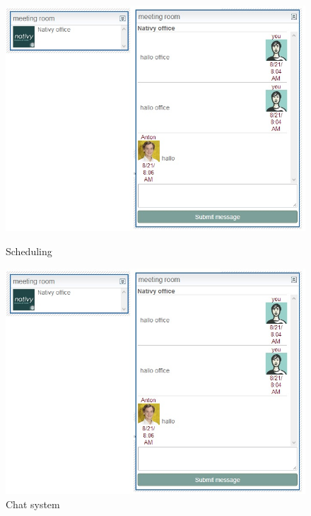 \begin{figure}[h]
\begin{center}
\includegraphics[scale=\figurescaling]{figures/chat.jpg}
\caption{Scheduling
\label{fig:scheduling}}
\includegraphics[scale=\figurescaling]{figures/chat.jpg}
\caption{Chat system
\label{fig:chat}}
\end{center}
\end{figure}